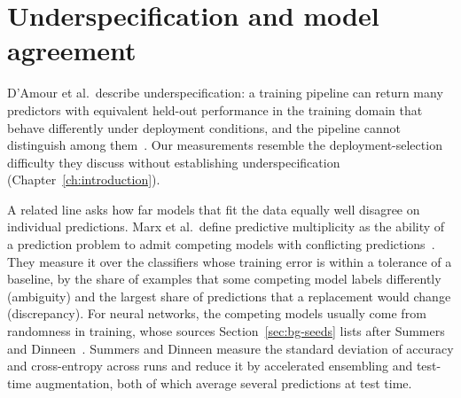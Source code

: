 \section{Underspecification and model agreement}
\label{sec:related-underspec}

D'Amour et al.\ describe underspecification: a training pipeline can
return many predictors with equivalent held-out performance in the
training domain that behave differently under deployment conditions,
and the pipeline cannot distinguish among them~\cite{damour2020underspecification}.
Our measurements resemble the deployment-selection difficulty they
discuss without establishing underspecification
(Chapter~\ref{ch:introduction}).

A related line asks how far models that fit the data equally well
disagree on individual predictions. Marx et al.\ define predictive
multiplicity as the ability of a prediction problem to admit competing
models with conflicting predictions~\cite{marx2020predictive}.
They measure it over the classifiers whose training error is within
a tolerance of a baseline, by the share of examples that some
competing model labels differently (ambiguity) and the largest share
of predictions that a replacement would change (discrepancy).
For neural networks, the competing models usually come from
randomness in training, whose sources Section~\ref{sec:bg-seeds}
lists after Summers and Dinneen~\cite{summers2021nondeterminism}.
Summers and Dinneen measure the standard deviation of accuracy and cross-entropy
across runs and reduce it by accelerated ensembling and test-time
augmentation, both of which average several predictions at test time.

